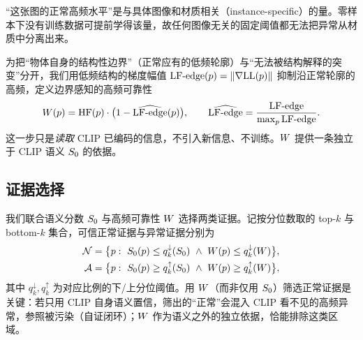 \begin{observation}\label{obs:ambiguity}
“这张图的正常高频水平”是与具体图像和材质相关（instance-specific）的量。零样本下没有训练数据可提前学得该量，故任何图像无关的固定阈值都无法把异常从材质中分离出来。
\end{observation}

为把“物体自身的结构性边界”（正常应有的低频轮廓）与“无法被结构解释的突变”分开，我们用低频结构的梯度幅值 $\mathrm{LF\text{-}edge}(p)=\lVert\nabla\mathrm{LL}(p)\rVert$ 抑制沿正常轮廓的高频，定义边界感知的高频可靠性
\begin{equation}
\label{eq:w}
W(p)=\mathrm{HF}(p)\cdot\big(1-\widehat{\mathrm{LF\text{-}edge}}(p)\big),\qquad
\widehat{\mathrm{LF\text{-}edge}}=\frac{\mathrm{LF\text{-}edge}}{\max_p \mathrm{LF\text{-}edge}}.
\end{equation}
这一步只是\emph{读取} CLIP 已编码的信息，不引入新信息、不训练。$W$ 提供一条独立于 CLIP 语义 $S_0$ 的依据。

\subsection{证据选择}
我们联合语义分数 $S_0$ 与高频可靠性 $W$ 选择两类证据。记按分位数取的 top-$k$ 与 bottom-$k$ 集合，可信正常证据与异常证据分别为
\begin{align}
\label{eq:evi-n}
\mathcal{N}&=\big\{p:\ \Szero(p)\le q_{k}^{\downarrow}(\Szero)\ \wedge\ \W(p)\le q_{k}^{\downarrow}(\W)\big\},\\
\label{eq:evi-a}
\mathcal{A}&=\big\{p:\ \Szero(p)\ge q_{k}^{\uparrow}(\Szero)\ \wedge\ \W(p)\ge q_{k}^{\uparrow}(\W)\big\},
\end{align}
其中 $q_k^{\downarrow},q_k^{\uparrow}$ 为对应比例的下/上分位阈值。用 $W$（而非仅用 $S_0$）筛选正常证据是关键：若只用 CLIP 自身语义置信，筛出的“正常”会混入 CLIP 看不见的高频异常，参照被污染（自证闭环）；$W$ 作为语义之外的独立依据，恰能排除这类区域。


